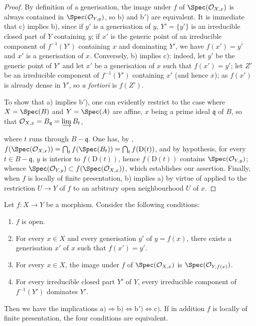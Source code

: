 
\begin{proof}
By definition of a generisation, the image under $f$ of $\Spec(\mathcal{O}_{X,x})$ is always contained in $\Spec(\mathcal{O}_{Y,y})$, so b) and b$'$) are equivalent.
It is immediate that c) implies b), since if $y'$ is a generisation of $y$, $Y'=\overline{\{y'\}}$ is an irreducible closed part of $Y$ containing $y$; if $x'$ is the generic point of an irreducible component of $f^{-1}(Y')$ containing $x$ and dominating $Y'$, we have $f(x')=y'$  and $x'$ is a generisation of $x$.
Conversely, b) implies c): indeed, let $y'$ be the generic point of $Y'$ and let $x'$ be a generisation of $x$ such that $f(x')=y'$; let $Z'$ be an irreducible component of $f^{-1}(Y')$ containing $x'$ (and hence $x$); as $f(x')$ is already dense in $Y'$, so \emph{a fortiori} is $f(Z')$.

To show that a) implies b$'$), one can evidently restrict to the case where $X=\Spec(B)$ and $Y=\Spec(A)$ are affine, $x$ being a prime ideal $\mathfrak{q}$ of $B$, so that $\mathcal{O}_{X,x}=B_\mathfrak{q}=\varinjlim B_t$,


where $t$ runs through $B-\mathfrak{q}$.
One has, by , $f(\Spec(\mathcal{O}_{X,x}))=\bigcap_t f(\Spec(B_t))=\bigcap_t f(\mathrm{D}(t))$, and by hypothesis, for every $t\in B-\mathfrak{q}$, $y$ is interior to $f(\mathrm{D}(t))$, hence $f(\mathrm{D}(t))$ contains $\Spec(\mathcal{O}_{Y,y})$; whence $\Spec(\mathcal{O}_{Y,y})\subset f(\Spec(\mathcal{O}_{X,x}))$, which establishes our assertion.
Finally, when $f$ is locally of finite presentation, b) implies a) by virtue of  applied to the restriction $U\to Y$ of $f$ to an arbitrary open neighbourhood $U$ of $x$.
\end{proof}

\begin{corollary}[1.10.4]
\label{IV.1.10.4}
Let $f:X\to Y$ be a morphism.
Consider the following conditions:
\begin{enumerate}
  \item[\rm a)] $f$ is open.
  \item[\rm b)] For every $x\in X$ and every generisation $y'$ of $y=f(x)$, there exists a generisation $x'$ of $x$ such that $f(x')=y'$.
  \item[\rm b$'$)] For every $x\in X$, the image under $f$ of $\Spec(\mathcal{O}_{X,x})$ is $\Spec(\mathcal{O}_{Y,f(x)})$.
  \item[\rm c)] For every irreducible closed part $Y'$ of $Y$, every irreducible component of $f^{-1}(Y')$ dominates $Y'$.
\end{enumerate}
Then we have the implications $\mathrm{a)}\Rightarrow\mathrm{b)}\Leftrightarrow\mathrm{b')}\Leftrightarrow\mathrm{c)}$.
If in addition $f$ is locally of finite presentation, the four conditions are equivalent.
\end{corollary}

